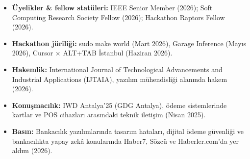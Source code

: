 \begin{itemize}
  \item \textbf{Üyelikler \& fellow statüleri:} IEEE Senior Member (2026); Soft Computing Research Society Fellow (2026); Hackathon Raptors Fellow (2026).
  \item \textbf{Hackathon jüriliği:} sudo make world (Mart 2026), Garage Inference (Mayıs 2026), Cursor × ALT+TAB İstanbul (Haziran 2026).
  \item \textbf{Hakemlik:} International Journal of Technological Advancements and Industrial Applications (IJTAIA), yazılım mühendisliği alanında hakem (2026).
  \item \textbf{Konuşmacılık:} IWD Antalya'25 (GDG Antalya), ödeme sistemlerinde kartlar ve POS cihazları arasındaki teknik iletişim (Nisan 2025).
  \item \textbf{Basın:} Bankacılık yazılımlarında tasarım hataları, dijital ödeme güvenliği ve bankacılıkta yapay zekâ konularında Haber7, Sözcü ve Haberler.com'da yer aldım (2026).
\end{itemize}
